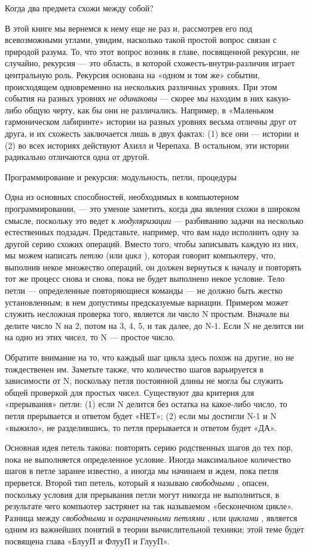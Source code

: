 Когда два предмета схожи между собой?

В этой книге мы вернемся к нему еще не раз и, рассмотрев его под всевозможными углами, увидим, насколько такой простой вопрос связан с природой разума. То, что этот вопрос возник в главе, посвященной рекурсии, не случайно, рекурсия --- это область, в которой схожесть-внутри-различия играет центральную роль. Рекурсия основана на «одном и том же» событии, происходящем одновременно на нескольких различных уровнях. При этом события на разных уровнях \emph{не одинаковы} --- скорее мы находим в них какую-либо общую черту, как бы они не различались. Например, в «Маленьком гармоническом лабиринте» истории на разных уровнях весьма отличны друг от друга, и их схожесть заключается лишь в двух фактах: (1) все они --- истории и (2) во всех историях действуют Ахилл и Черепаха. В остальном, эти истории радикально отличаются одна от другой.

Программирование и рекурсия: модульность, петли, процедуры

Одна из основных способностей, необходимых в компьютерном программировании, --- это умение заметить, когда два явления схожи в широком смысле, поскольку это ведет к \emph{модуляризации} --- разбиванию задачи на несколько естественных подзадач. Представьте, например, что вам надо исполнить одну за другой серию схожих операций. Вместо того, чтобы записывать каждую из них, мы можем написать \emph{петлю} (или \emph{цикл} ), которая говорит компьютеру, что, выполнив некое множество операций, он должен вернуться к началу и повторять тот же процесс снова и снова, пока не будет выполнено некое условие. Тело петли --- определенные повторяющиеся команды --- не должно быть жестко установленным; в нем допустимы предсказуемые вариации. Примером может служить несложная проверка того, является ли число N простым. Вначале вы делите число N на 2, потом на 3, 4, 5, и так далее, до N-1. Если N не делится ни на одно из этих чисел, то N --- простое число.

Обратите внимание на то, что каждый шаг цикла здесь похож на другие, но не тождественен им. Заметьте также, что количество шагов варьируется в зависимости от N, поскольку петля постоянной длины не могла бы служить общей проверкой для простых чисел. Существуют два критерия для «прерывания» петли: (1) если N делится без остатка на какое-либо число, то петля прерывается и ответом будет «НЕТ»; (2) если мы достигли N-1 и N «выжило», не разделившись, то петля прерывается и ответом будет «ДА».

Основная идея петель такова: повторять серию родственных шагов до тех пор, пока не выполняется определенное условие. Иногда максимальное количество шагов в петле заранее известно, а иногда мы начинаем и ждем, пока петля прервется. Второй тип петель, который я называю \emph{свободными} , опасен, поскольку условия для прерывания петли могут никогда не выполниться, в результате чего компьютер застрянет на так называемом «бесконечном цикле». Разница между \emph{свободными} и \emph{ограниченными петлями} , или \emph{циклами} , является одним из важнейших понятий в теории вычислительной техники; этой теме будет посвящена глава «БлууП и ФлууП и ГлууП».

